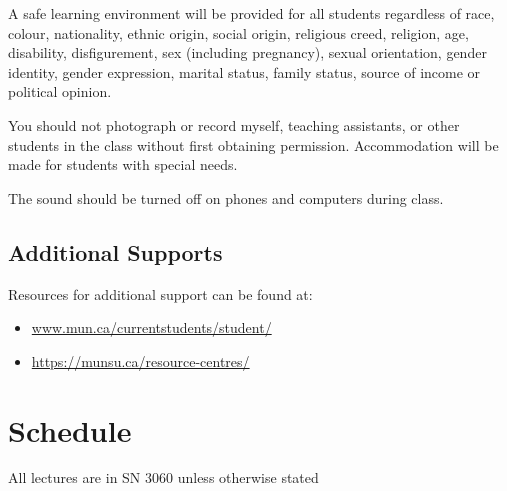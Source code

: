 \documentclass[
]{book}
\begin{document}
A safe learning environment will be provided for all students regardless of race, colour, nationality, ethnic origin, social origin, religious creed, religion, age, disability, disfigurement, sex (including pregnancy), sexual orientation, gender identity, gender expression, marital status, family status, source of income or political opinion.

You should not photograph or record myself, teaching assistants, or other students in the class without first obtaining permission. Accommodation will be made for students with special needs.

The sound should be turned off on phones and computers during class.

\hypertarget{additional-supports}{%
\section{Additional Supports}\label{additional-supports}}

Resources for additional support can be found at:

\begin{itemize}
\item
  \url{www.mun.ca/currentstudents/student/}
\item
  \url{https://munsu.ca/resource-centres/}
\end{itemize}

\hypertarget{schedule}{%
\chapter{Schedule}\label{schedule}}

All lectures are in SN 3060 unless otherwise stated
\end{document}
